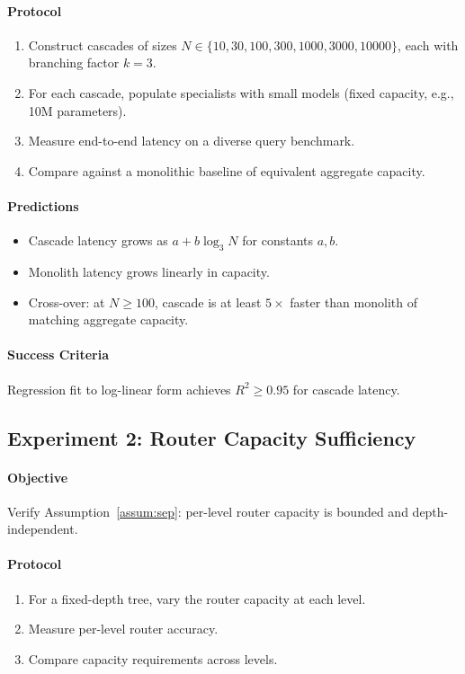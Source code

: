 \documentclass[11pt,a4paper]{article}
\theoremstyle{definition}
\theoremstyle{remark}
\begin{document}
\paragraph{Protocol}
\begin{enumerate}
    \item Construct cascades of sizes $N \in \{10, 30, 100, 300, 1000, 3000, 10000\}$, each with branching factor $k = 3$.
    \item For each cascade, populate specialists with small models (fixed capacity, e.g., 10M parameters).
    \item Measure end-to-end latency on a diverse query benchmark.
    \item Compare against a monolithic baseline of equivalent aggregate capacity.
\end{enumerate}

\paragraph{Predictions}
\begin{itemize}
    \item Cascade latency grows as $a + b \log_3 N$ for constants $a, b$.
    \item Monolith latency grows linearly in capacity.
    \item Cross-over: at $N \geq 100$, cascade is at least $5\times$ faster than monolith of matching aggregate capacity.
\end{itemize}

\paragraph{Success Criteria}
Regression fit to log-linear form achieves $R^2 \geq 0.95$ for cascade latency.

\subsection{Experiment 2: Router Capacity Sufficiency}

\paragraph{Objective} Verify Assumption~\ref{assum:sep}: per-level router capacity is bounded and depth-independent.

\paragraph{Protocol}
\begin{enumerate}
    \item For a fixed-depth tree, vary the router capacity at each level.
    \item Measure per-level router accuracy.
    \item Compare capacity requirements across levels.
\end{enumerate}
\end{document}
